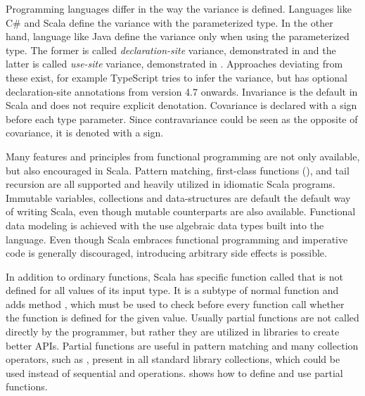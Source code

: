 

Programming languages differ in the way the variance is defined. Languages like C\# and Scala define the variance with the parameterized type. In the other hand, language like Java define the variance only when using the parameterized type. The former is called \textit{declaration-site} variance, demonstrated in  and the latter is called \textit{use-site} variance, demonstrated in . Approaches deviating from these exist, for example TypeScript tries to infer the variance, but has optional declaration-site annotations from version 4.7 onwards. Invariance is the default in Scala and does not require explicit denotation. Covariance is declared with a \inlinecode{+} sign before each type parameter. Since contravariance could be seen as the opposite of covariance, it is denoted with a \inlinecode{-} sign.





Many features and principles from functional programming are not only available, but also encouraged in Scala. Pattern matching, first-class functions (), and tail recursion are all supported and heavily utilized in idiomatic Scala programs. Immutable variables, collections and data-structures are default the default way of writing Scala, even though mutable counterparts are also available. Functional data modeling is achieved with the use algebraic data types built into the language. Even though Scala embraces functional programming and imperative code is generally discouraged, introducing arbitrary side effects is possible.



In addition to ordinary functions, Scala has specific function called  that is not defined for all values of its input type. It is a subtype of normal function and adds method , which must be used to check before every function call whether the function is defined for the given value. Usually partial functions are not called directly by the programmer, but rather they are utilized in libraries to create better APIs. Partial functions are useful in pattern matching and many collection operators, such as , present in all standard library collections, which could be used instead of sequential  and  operations.  shows how to define and use partial functions.

